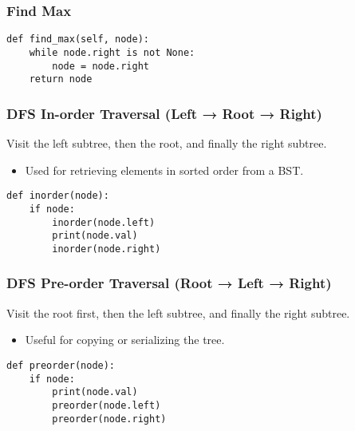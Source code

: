 \subsubsection{Find Max}
\begin{algo}
\begin{lstlisting}
def find_max(self, node):
    while node.right is not None:
        node = node.right
    return node
\end{lstlisting}
\end{algo}

\subsubsection{DFS In-order Traversal (Left → Root → Right)}
\begin{definition}
    Visit the left subtree, then the root, and finally the right subtree.
    \begin{itemize}
        \item Used for retrieving elements in sorted order from a BST.
    \end{itemize}
\end{definition}

\begin{algo}
\begin{lstlisting} 
def inorder(node):
    if node:
        inorder(node.left)
        print(node.val)
        inorder(node.right)
\end{lstlisting}  
\end{algo}
\newpage

\subsubsection{DFS Pre-order Traversal (Root → Left → Right)}
\begin{definition}
    Visit the root first, then the left subtree, and finally the right subtree.
    \begin{itemize}
        \item Useful for copying or serializing the tree.
    \end{itemize}
\end{definition}

\begin{algo} 
\begin{lstlisting}
def preorder(node):
    if node:
        print(node.val)
        preorder(node.left)
        preorder(node.right)
\end{lstlisting}
\end{algo}

